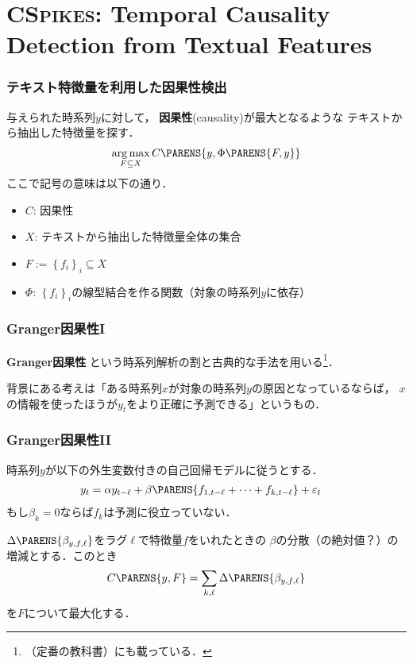 \documentclass[12pt,noamssymb,usepdftitle=false]{beamer}
\newcommand{\braces}[1]{\left\{#1\right\}}
\DeclareMathOperator*{\argmax}{arg\,max}
\begin{document}
\section{CS\textsc{pikes}: Temporal Causality Detection from Textual Features}
\begin{frame}
    \frametitle{テキスト特徴量を利用した因果性検出}
    与えられた時系列$y$に対して，
    \textbf{因果性}(causality)が最大となるような
    テキストから抽出した特徴量を探す．
    \begin{align}
        \argmax_{F \subseteq X} {C}\PARENS{y, \Phi\PARENS{F,y}}
    \end{align}
    ここで記号の意味は以下の通り．
    \begin{itemize}
        \item ${C}$: 因果性
        \item $X$: テキストから抽出した特徴量全体の集合
        \item $F:=\braces{f_i}_i \subseteq X$
        \item $\Phi$: $\braces{f_i}_i$の線型結合を作る関数（対象の時系列$y$に依存）
    \end{itemize}

\end{frame}

\begin{frame}
    \frametitle{Granger因果性I}
    \textbf{Granger因果性}\parencite{granger1988}
    という時系列解析の割と古典的な手法を用いる\footnote[frame]{%
        \textcite{hamilton1994}（定番の教科書）にも載っている．
    }．

    \bigskip

    背景にある考えは「ある時系列$x$が対象の時系列$y$の原因となっているならば，
    $x$の情報を使ったほうが$y_t$をより正確に予測できる」というもの．

\end{frame}

\begin{frame}
    \frametitle{Granger因果性II}
    時系列$y$が以下の外生変数付きの自己回帰モデルに従うとする．
    \begin{align}
        y_t &= \alpha y_{t - \ell} + \beta \PARENS{f_{1, t - \ell} + \cdots + f_{k, t - \ell}} + \varepsilon_t
    \end{align}
    もし$\beta_k = 0$ならば$f_k$は予測に役立っていない．

    \bigskip

    $\Delta\PARENS{\beta_{y,f,\ell}}$をラグ$\ell$で特徴量$f$をいれたときの
    $\beta$の分散（の絶対値？）の増減とする．このとき
    \begin{align*}
        C\PARENS{y,F} = \sum_{k, \ell} \Delta\PARENS{\beta_{y,f,\ell}}
    \end{align*}
    を$F$について最大化する．

\end{frame}
\end{document}
